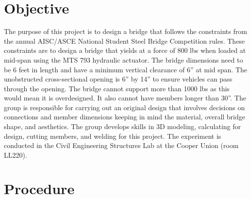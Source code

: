 \documentclass{article}
\begin{document}
    
    \doublespacing
    \tableofcontents
    \newpage
    \listoftables
    \listoffigures
    \newpage
    \section{Objective}
    \indent The purpose of this project is to design a bridge that follows the constraints from the annual AISC/ASCE National Student Steel Bridge Competition rules. These constraints are to design a bridge that yields at a force of 800 lbs when loaded at mid-span using the MTS 793 hydraulic actuator. The bridge dimensions need to be 6 feet in length and have a minimum vertical clearance of 6” at mid span. The unobstructed cross-sectional opening is 6” by 14” to ensure vehicles can pass through the opening. The bridge cannot support more than 1000 lbs as this would mean it is overdesigned. It also cannot have members longer than 30”. The group is responsible for carrying out an original design that involves decisions on connections and member dimensions keeping in mind the material, overall bridge shape, and aesthetics. The group develops skills in 3D modeling, calculating for design, cutting members, and welding for this project. The experiment is conducted in the Civil Engineering Structures Lab at the Cooper Union (room LL220).
    
    \newpage
    \section{Procedure}
\end{document}

